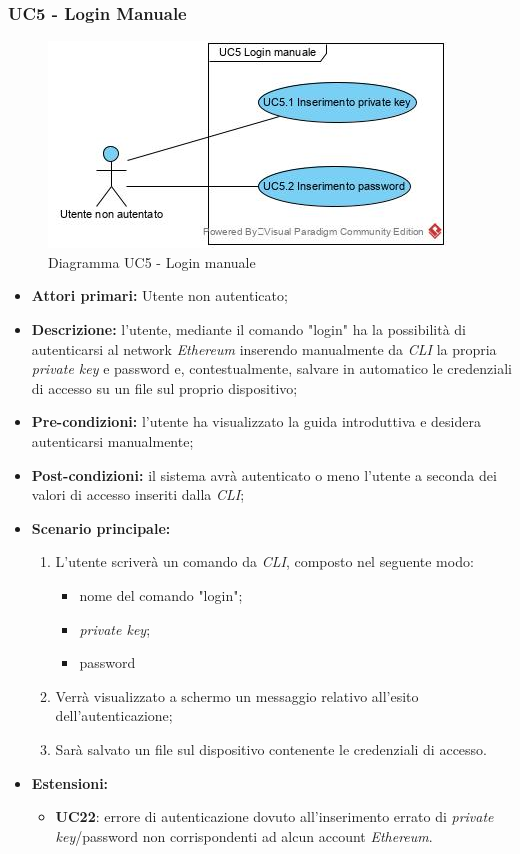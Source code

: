 \subsubsection{UC5 - Login Manuale}
\begin{figure}[h]
	\centering
	\includegraphics[width=0.8\linewidth]{res/img/UC5.jpg}
	\caption{Diagramma UC5 - Login manuale}
\end{figure}
\begin{itemize}
	\item \textbf{Attori primari:} Utente non autenticato;
	\item \textbf{Descrizione:} l'utente, mediante il comando "login" ha la possibilità di autenticarsi al network \textit{Ethereum\glo} inserendo manualmente da \textit{CLI\glo} la propria \textit{private key\glos} e password e, contestualmente, salvare in automatico le credenziali di accesso su un file sul proprio dispositivo;
	\item \textbf{Pre-condizioni:} l'utente ha visualizzato la guida introduttiva e desidera autenticarsi manualmente;
	\item \textbf{Post-condizioni:} il sistema avrà autenticato o meno l'utente a seconda dei valori di accesso inseriti dalla \textit{CLI\glos};
	\item \textbf{Scenario principale:}
	\begin{enumerate}
		\item L'utente scriverà un comando da \textit{CLI\glos}, composto nel seguente modo:
		\begin{itemize}
			\item nome del comando "login";
			\item \textit{private key\glos};
			\item password
		\end{itemize}
		\item Verrà visualizzato a schermo un messaggio relativo all'esito dell'autenticazione;
		\item Sarà salvato un file sul dispositivo contenente le credenziali di accesso.
	\end{enumerate}
	\item \textbf{Estensioni:} 
	\begin{itemize}
		\item \textbf{UC22}: errore di autenticazione dovuto all'inserimento errato di \textit{private key\glos}/password non corrispondenti ad alcun account \textit{Ethereum\glos}.
	\end{itemize}
\end{itemize}
